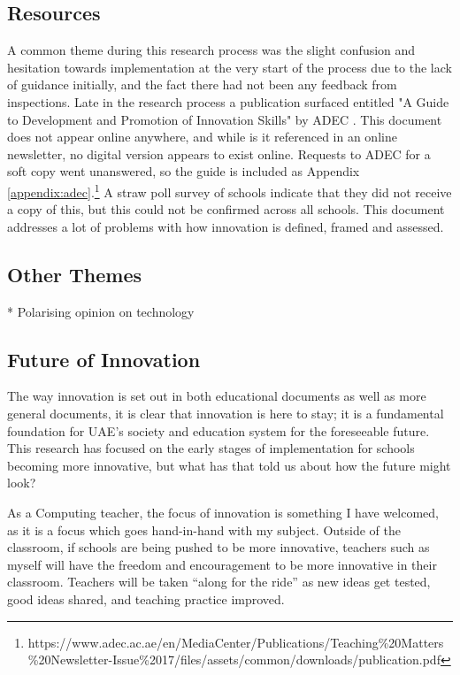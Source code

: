 \subsection{Resources}
A common theme during this research process was the slight confusion and hesitation towards implementation at the very start of the process due to the lack of guidance initially, and the fact there had not been any feedback from inspections. Late in the research process a publication surfaced entitled "A Guide to Development and Promotion of Innovation Skills" by ADEC \citet{ADEC2015a}. This document does not appear online anywhere, and while is it referenced in an online newsletter, no digital version appears to exist online. Requests to ADEC for a soft copy went unanswered, so the guide is included as Appendix \ref{appendix:adec}.\footnote{https://www.adec.ac.ae/en/MediaCenter/Publications/Teaching\%20Matters\%20Newsletter-Issue\%2017/files/assets/common/downloads/publication.pdf} A straw poll survey of schools indicate that they did not receive a copy of this, but this could not be confirmed across all schools. This document addresses a lot of problems with how innovation is defined, framed and assessed.

\subsection{Other Themes}
* Polarising opinion on technology

\subsection{Future of Innovation}

The way innovation is set out in both educational documents as well as more general documents, it is clear that innovation is here to stay; it is a fundamental foundation for UAE’s society and education system for the foreseeable future.
This research has focused on the early stages of implementation for schools becoming more innovative, but what has that told us about how the future might look?

As a Computing teacher, the focus of innovation is something I have welcomed, as it is a focus which goes hand-in-hand with my subject. Outside of the classroom, if schools are being pushed to be more innovative, teachers such as myself will have the freedom and encouragement to be more innovative in their classroom. Teachers will be taken “along for the ride” as new ideas get tested, good ideas shared, and teaching practice improved.

